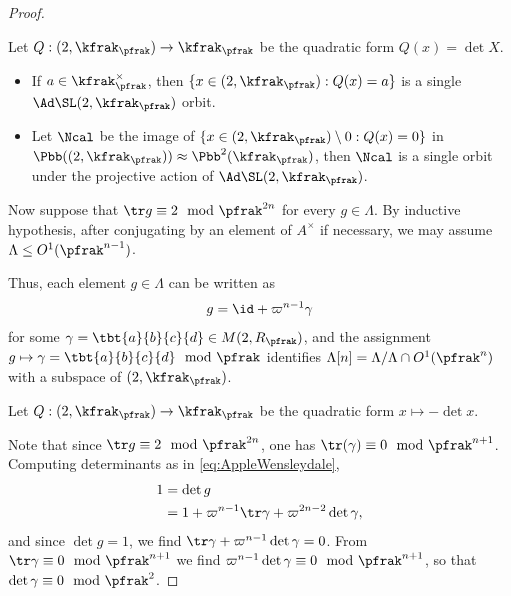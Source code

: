 \begin{proof}
    \begin{lemma}\label{lemma:killingform}
        Let $Q: \sl(2,\kfrak_\pfrak) \to \kfrak_\pfrak$ be the quadratic form $Q(x) = \det X$.
        \begin{itemize}
            \item If $a \in \kfrak_\pfrak^\times$, then $\{x \in \sl(2,\kfrak_\pfrak): Q(x) = a\}$ is a single $\Ad \SL(2,\kfrak_\pfrak)$ orbit.
            \item Let $\Ncal$ be the image of $\{x \in \sl(2,\kfrak_\pfrak) \setminus 0:  Q(x)=0\}$ in $\Pbb(\sl(2,\kfrak_\pfrak))\approx \Pbb^2(\kfrak_\pfrak)$, then $\Ncal$ is a single orbit under the projective action of $\Ad \SL(2,\kfrak_\pfrak)$.
        \end{itemize}
    \end{lemma}
    Now suppose that $\tr g \equiv 2 \mod \pfrak^{2n}$ for every $g\in \Lambda$. By inductive hypothesis, after conjugating by an element of $A^\times$ if necessary, we may assume $\Lambda \leq O^1(\pfrak^{n-1})$.

    Thus, each element $g\in \Lambda$ can be written as
    \begin{align}\label{eq:AppleWensleydale}
        g = \id +\varpi^{n-1} \gamma
    \end{align}
    for some $\gamma =\tbt{a}{b}{c}{d} \in M(2, R_\pfrak)$, and the assignment $g \mapsto \gamma = \tbt{a}{b}{c}{d} \mod \pfrak$ identifies $\Lambda[n] = \Lambda /\Lambda \cap O^1(\pfrak^n)$ with a subspace of  $\sl(2,\kfrak_\pfrak)$.

    \begin{claim}\label{claim:BreadfruitDessertnyjBelyj}
        Let $Q:\sl(2,\kfrak_\pfrak) \to \kfrak_\pfrak$ be the quadratic form $x \mapsto -\det x$.
    \end{claim}

    Note that since $\tr g \equiv 2 \mod \pfrak^{2n}$, one has $\tr(\gamma) \equiv 0 \mod \pfrak^{n+1}$.
    Computing determinants as in \ref{eq:AppleWensleydale},
    \begin{align*}
        1 & = \det g                                                  \\
          & = 1 + \varpi^{n-1} \tr \gamma + \varpi^{2n-2}\det \gamma,
    \end{align*}
    and since $\det g =1$, we find $\tr \gamma +\varpi^{n-1}\det \gamma =0$. From $\tr \gamma  \equiv 0 \mod \pfrak^{n+1}$ we find $ \varpi^{n-1}\det \gamma \equiv 0 \mod \pfrak^{n+1}$, so that $\det \gamma \equiv 0 \mod \pfrak^2$.





\end{proof}
